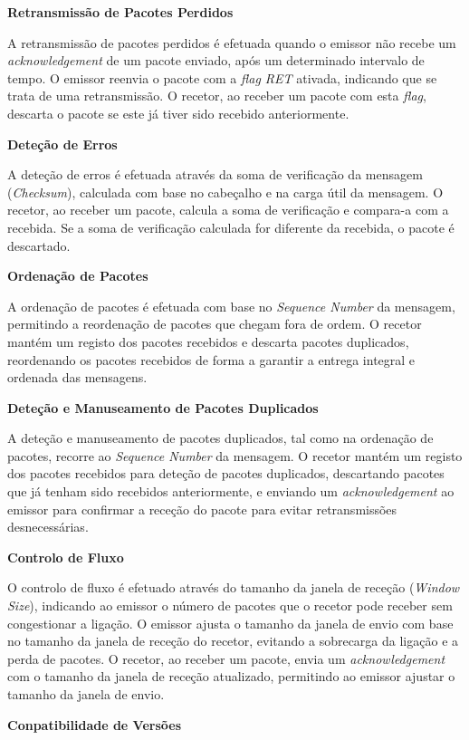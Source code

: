 \documentclass[a4paper,12pt]{scrreprt}
\begin{document}
\textbf{Retransmissão de Pacotes Perdidos}

A retransmissão de pacotes perdidos é efetuada quando o emissor não recebe um
\textit{acknowledgement} de um pacote enviado, após um determinado intervalo de
tempo. O emissor reenvia o pacote com a \textit{flag RET} ativada, indicando que
se trata de uma retransmissão. O recetor, ao receber um pacote com esta \textit{flag},
descarta o pacote se este já tiver sido recebido anteriormente.


\textbf{Deteção de Erros}

A deteção de erros é efetuada através da soma de verificação da mensagem (\textit{Checksum}),
calculada com base no cabeçalho e na carga útil da mensagem. O recetor, ao receber
um pacote, calcula a soma de verificação e compara-a com a recebida. Se a soma de
verificação calculada for diferente da recebida, o pacote é descartado.


\textbf{Ordenação de Pacotes}

A ordenação de pacotes é efetuada com base no \textit{Sequence Number} da mensagem,
permitindo a reordenação de pacotes que chegam fora de ordem. O recetor mantém
um registo dos pacotes recebidos e descarta pacotes duplicados, reordenando os
pacotes recebidos de forma a garantir a entrega integral e ordenada das mensagens.


\textbf{Deteção e Manuseamento de Pacotes Duplicados}

A deteção e manuseamento de pacotes duplicados, tal como na ordenação de pacotes, recorre ao
\textit{Sequence Number} da mensagem. O recetor mantém um registo dos pacotes recebidos para
deteção de pacotes duplicados, descartando pacotes que já tenham sido recebidos anteriormente, e
enviando um \textit{acknowledgement} ao emissor para confirmar a receção do pacote para evitar
retransmissões desnecessárias.

\textbf{Controlo de Fluxo}

O controlo de fluxo é efetuado através do tamanho da janela de receção (\textit{Window Size}),
indicando ao emissor o número de pacotes que o recetor pode receber sem congestionar a ligação.
O emissor ajusta o tamanho da janela de envio com base no tamanho da janela de receção do recetor,
evitando a sobrecarga da ligação e a perda de pacotes. O recetor, ao receber um pacote, envia um
\textit{acknowledgement} com o tamanho da janela de receção atualizado, permitindo ao emissor ajustar
o tamanho da janela de envio.

\textbf{Conpatibilidade de Versões}
\end{document}
